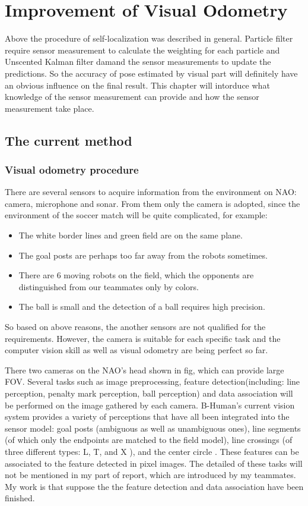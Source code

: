 \chapter{Improvement of Visual Odometry}\label{Chap:Imp}
Above the procedure of self-localization was described in general. Particle filter require sensor measurement to calculate the weighting for each particle and Unscented Kalman filter damand the sensor measurements to update the predictions. So the accuracy of pose estimated by visual part will definitely have an obvious influence on the final result. This chapter will intorduce what knowledge of the sensor measurement can provide and how the sensor measurement take place. 
\section{The current method}
\subsection{Visual odometry procedure}
There are several sensors to acquire information from the environment on NAO: camera, microphone and sonar. From them only the camera is adopted, since the environment of the soccer match will be quite complicated, for example:
\begin{itemize}
    \item The white border lines and green field are on the same plane.
    \item The goal posts are perhaps too far away from the robots sometimes.
    \item There are 6 moving robots on the field, which the opponents are distinguished from our teammates only by colors.
    \item The ball is small and the detection of a ball requires high precision.
\end{itemize}
So based on above reasons, the another sensors are not qualified for the requirements. However, the camera is suitable for each specific task and the computer vision skill as well as visual odometry are being perfect so far.

There two cameras on the NAO's head shown in fig, which can provide large FOV. Several tasks such as image preprocessing, feature detection(including: line perception, penalty mark perception, ball perception) and data association will be performed on the image gathered by each camera. B-Human's current vision system provides a variety of perceptions that have all been integrated into the sensor model: goal posts (ambiguous as well as unambiguous ones), line segments (of which only the endpoints are matched to the field model), line crossings (of three different types: L, T, and X ), and the center circle \cite{BHumanCodeRelease2012}. These features can be associated to the feature detected in pixel images. The detailed of these tasks will not be mentioned in my part of report, which are introduced by my teammates. My work is that suppose the the feature detection and data association have been finished.

